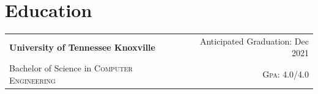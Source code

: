 \documentclass[a4paper,10pt]{article}
\begin{document}
\section{Education}
\begin{tabularx}{\textwidth}{lXr}
   \textbf{University of Tennessee Knoxville} & & Anticipated Graduation: Dec 2021\\
   Bachelor of Science in \textsc{Computer Engineering} &  & \normalsize \textsc{Gpa}: 4.0/4.0\\
\end{tabularx}

\end{document}
